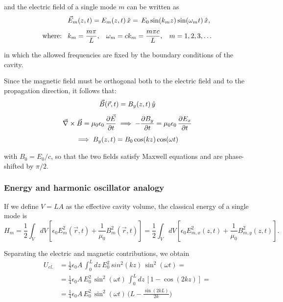 and the electric field of a single mode $m$ can be written as
\begin{equation}\label{eqn:11-single-mode-electric-field}
\begin{aligned}
&\vec{E}_{m}(z,t) = E_{m}(z,t)\,\hat{x} =
\,E_0\sin(k_m z)\sin(\omega_m t)\,\hat{x},\\[1ex]
\text{where:}\hspace{2ex}
&k_m = \frac{m\pi}{L},
\hspace{2ex}
\omega_m=ck_m=\frac{m\pi c}{L},
\hspace{2ex}
m=1,2,3,\dots
\end{aligned}
\end{equation}

in which the allowed frequencies are fixed by the boundary conditions of the cavity.

Since the magnetic field must be orthogonal both to the electric field and to the propagation direction, it follows that:
\begin{gather}
\vec{B}(\vec{r},t) = B_y(z,t)\,\hat{y}\\[1ex]
\vec{\nabla} \times \vec{B} = 
\mu_0 \epsilon_0\, \pdv{\vec{E}}{t} 
\implies - \pdv{B_y}{t} = 
\mu_0 \epsilon_0\, \pdv{E_x}{t} \\[1ex]
\implies B_y(z,t) = B_0 \cos(kz) \cos(\omega t)
\end{gather} 

with $B_0=E_0/c$, so that the two fields satisfy Maxwell equations and are phase-shifted by $\pi/2$.

\subsubsection{Energy and harmonic oscillator analogy}

If we define $V=LA$ as the effective cavity volume, the classical energy of a single mode is
\begin{equation}\label{eqn:11-single-mode-classical-energy}
H_m = \frac12\int_V dV
\left[
    \epsilon_0 E^2_{m}(\vec r,t)+\frac{1}{\mu_0}B^2_{m}(\vec r,t)
\right] =
\frac12\int_V dV
\left[
    \epsilon_0 E_{m,x}^2(z,t)+\frac{1}{\mu_0}B_{m,y}^2(z,t)
\right].
\end{equation}

Separating the electric and magnetic contributions, we obtain
\begin{equation}\label{eqn:11-single-mode-electric-energy}
\begin{split}
    U_{el.} &= \frac{1}{2}\epsilon_0 A\, \int_0^L dz \, E_0^2\, sin^2(kz)\, \sin^2(\omega t) = \\[1ex]
    &= \frac{1}{4}\epsilon_0 A\, E_0^2\, \sin^2(\omega t) \, \int_0^L dz \, [1-\cos(2kz)] = \\[1ex]
    &=\frac{1}{4}\epsilon_0 A\, E_0^2\, \sin^2(\omega t) \, \bigl(L-\frac{\sin(2kL)}{2k}\bigr)
\end{split}
\end{equation}

